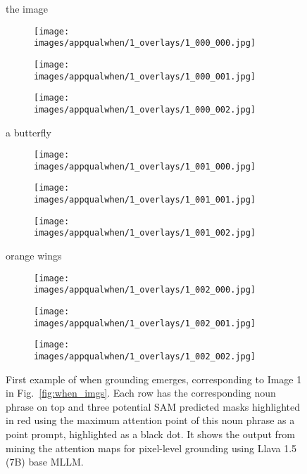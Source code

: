 \begin{figure}[t]
\centering
the image
\begin{subfigure}{0.16\textwidth}
\texttt{[image: images/appqualwhen/1\_overlays/1\_000\_000.jpg]}
\end{subfigure}%
\begin{subfigure}{0.16\textwidth}
\texttt{[image: images/appqualwhen/1\_overlays/1\_000\_001.jpg]}
\end{subfigure}%
\begin{subfigure}{0.16\textwidth}
\texttt{[image: images/appqualwhen/1\_overlays/1\_000\_002.jpg]}
\end{subfigure}

a butterfly
\begin{subfigure}{0.16\textwidth}
\texttt{[image: images/appqualwhen/1\_overlays/1\_001\_000.jpg]}
\end{subfigure}%
\begin{subfigure}{0.16\textwidth}
\texttt{[image: images/appqualwhen/1\_overlays/1\_001\_001.jpg]}
\end{subfigure}%
\begin{subfigure}{0.16\textwidth}
\texttt{[image: images/appqualwhen/1\_overlays/1\_001\_002.jpg]}
\end{subfigure}

orange wings
\begin{subfigure}{0.16\textwidth}
\texttt{[image: images/appqualwhen/1\_overlays/1\_002\_000.jpg]}
\end{subfigure}%
\begin{subfigure}{0.16\textwidth}
\texttt{[image: images/appqualwhen/1\_overlays/1\_002\_001.jpg]}
\end{subfigure}%
\begin{subfigure}{0.16\textwidth}
\texttt{[image: images/appqualwhen/1\_overlays/1\_002\_002.jpg]}
\end{subfigure}
\caption{First example of when grounding emerges, corresponding to Image 1 in Fig.~\ref{fig:when_imgs}. Each row has the corresponding noun phrase on top and three potential SAM predicted masks highlighted in red using the maximum attention point of this noun phrase as a point prompt, highlighted as a black dot. It shows the output from mining the attention maps for pixel-level grounding using Llava 1.5 (7B) base MLLM.}
\label{fig:when1}
\end{figure}

